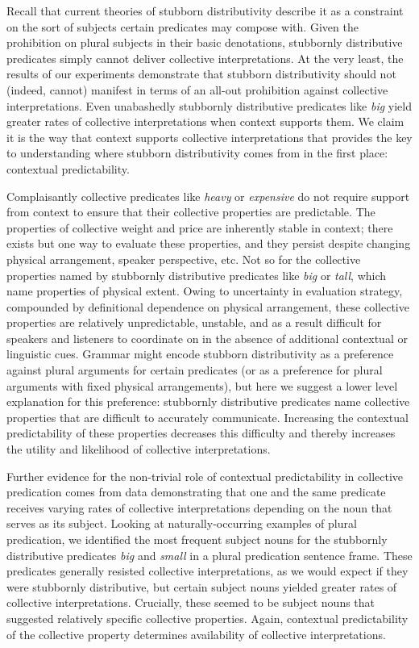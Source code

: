 \documentclass[linguex]{sp}
\begin{document}
Recall that current theories of stubborn distributivity describe it as a constraint on the sort of subjects certain predicates may compose with. 
Given the prohibition on plural subjects in their basic denotations, stubbornly distributive predicates simply cannot deliver collective interpretations. At the very least, the results of our experiments demonstrate that stubborn distributivity should not (indeed, cannot) manifest in terms of an all-out prohibition against collective interpretations. Even unabashedly stubbornly distributive predicates like \emph{big} yield greater rates of collective interpretations when context supports them. We claim it is the way that context supports collective interpretations that provides the key to understanding where stubborn distributivity comes from in the first place: contextual predictability.

Complaisantly collective predicates like \emph{heavy} or \emph{expensive} do not require support from context to ensure that their collective properties are predictable. The properties of collective weight and price are inherently stable in context; there exists but one way to evaluate these properties, and they persist despite changing physical arrangement, speaker perspective, etc. Not so for the collective properties named by stubbornly distributive predicates like \emph{big} or \emph{tall}, which name properties of physical extent. Owing to uncertainty in evaluation strategy, compounded by definitional dependence on physical arrangement, these collective properties are relatively unpredictable, unstable, and as a result difficult for speakers and listeners to coordinate on in the absence of additional contextual or linguistic cues. Grammar might encode stubborn distributivity as a preference against plural arguments for certain predicates (or as a preference for plural arguments with fixed physical arrangements), but here we suggest a lower level explanation for this preference: stubbornly distributive predicates name collective properties that are difficult to accurately communicate. Increasing the contextual predictability of these properties decreases this difficulty and thereby increases the utility and likelihood of collective interpretations.

Further evidence for the non-trivial role of contextual predictability in collective predication comes from data demonstrating that one and the same predicate receives varying rates of collective interpretations depending on the noun that serves as its subject. Looking at naturally-occurring examples of plural predication, we identified the most frequent subject nouns for the stubbornly distributive predicates \emph{big} and \emph{small} in a plural predication sentence frame. These predicates generally resisted collective interpretations, as we would expect if they were stubbornly distributive, but certain subject nouns yielded greater rates of collective interpretations. Crucially, these seemed to be subject nouns that suggested relatively specific collective properties. 
Again, contextual predictability of the collective property determines availability of collective interpretations.
\end{document}
